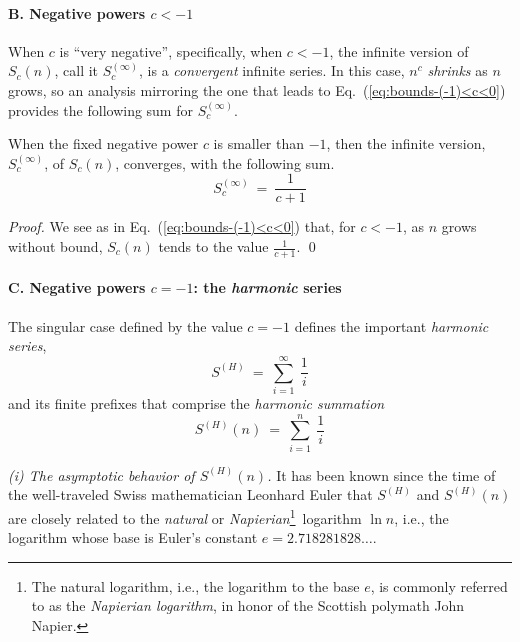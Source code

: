 \paragraph{B. Negative powers $c < -1$}

When $c$ is ``very negative'', specifically, when $c < -1$, the infinite version of $S_c(n)$, call it $S_c^{(\infty)}$, is a {\em convergent} infinite series.  In this case, $n^c$ {\em shrinks} as $n$ grows, so an analysis mirroring the one that leads to Eq.~(\ref{eq:bounds-(-1)<c<0}) provides the following sum for $S_c^{(\infty)}$.

\begin{prop}
\label{thm:bounds-negative-(not-1)-sum-xc}
When the fixed negative power $c$ is smaller than $-1$, then the infinite version, $S_c^{(\infty)}$, of $S_c(n)$, converges, with the following sum.
\begin{equation}
\label{eq:bounds-negative-(not-1)-sum-xc}
S_c^{(\infty)} \ = \ \frac{1}{c+1}
\end{equation}
\end{prop}

\begin{proof}
We see as in Eq.~(\ref{eq:bounds-(-1)<c<0}) that, for $c<-1$, as $n$ grows without bound, $S_c(n)$ tends to the value ${\displaystyle \frac{1}{c+1}}$.  \qed
\end{proof}

\paragraph{C. Negative powers $c = -1$: the {\em harmonic} series}

The singular case defined by the value $c = -1$ defines the important {\it harmonic series},
\[ S^{(H)} \ = \ \sum_{i=1}^\infty \ \frac{1}{i} \]
and its finite prefixes that comprise the {\it harmonic summation}
\[ S^{(H)}(n) \ = \ \sum_{i=1}^n \ \frac{1}{i} \]

\smallskip

 
 
{\it (i) The asymptotic behavior of $S^{(H)}(n)$.}
It has been known since the time of the well-traveled Swiss mathematician Leonhard Euler that $S^{(H)}$ and $S^{(H)}(n)$ are closely related to the {\em natural} or {\it Napierian}\footnote{The natural logarithm, i.e., the logarithm to the base $e$, is commonly referred to as the {\it Napierian logarithm}, in honor of the Scottish polymath John Napier.}~logarithm $\ln n$, i.e., the logarithm whose base is Euler's constant $e = 2.718281828 \ldots$.

